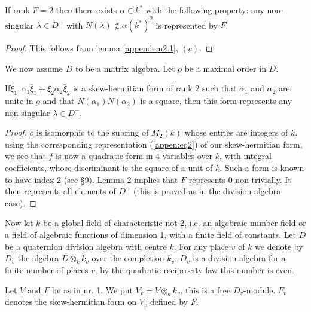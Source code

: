 \begin{lemma}\label{appen:lem2.2}%
If rank $F= 2$ then there exists $\alpha \in k^*$
  with the following property: any non-singular $\lambda \in D^-$ with
  $N(\lambda) \notin \alpha (k^*)^2$ is represented by $F$. 
\end{lemma}

\begin{proof}
This follows from lemma \ref{appen:lem2.1}, $(c)$.
\end{proof}

We now assume $D$ to be a matrix algebra. Let $\underbar{o}$ be a
maximal order in $D$. 

\begin{lemma}\label{appen:lem2.3}
 If\pageoriginale $\xi_1,\alpha_1 \bar{\xi}_1+ \xi_2 \alpha_2
 \bar{\xi}_2$ is a skew-hermitian form of rank 2 such that $\alpha_1$
 and $\alpha_2$ are unite in $\underbar{o}$ and that
 $N(\alpha_1)N(\alpha_2)$ is a square, then this form represents any
 non-singular $\lambda \in D^-$. 
\end{lemma}

\begin{proof}
$\underbar{o}$ is isomorphic to the subring of $M_2(k)$ whose entries
  are integers of $k$. using the corresponding representation (\ref{appen:eq2}) of
  our skew-hermitian form, we see that $f$ is now a quadratic form in
  $4$ variables over $k$, with integral coefficients, whose
  discriminant is the square of a unit of $k$. Such a form is known to
  have index 2 (see \cite{keyE3} \S 9). Lemma 2 implies that $F$
  represents $0$ non-trivially. It then represents all elements of
  $D^-$ (this is proved as in the division algebra case). 
\end{proof}


\medskip
{}%

Now let $k$ be a global field of characteristic not 2, i.e. an
algebraic number field or a field of algebraic functions of dimension
1, with a finite field of constants. Let $D$ be a quaternion
division algebra with centre $k$. For any place $v$ of $k$ we denote
by $D_v$ the algebra $D \otimes_k k_v$ over the completion
$k_v$. $D_v$ is a division algebra for a finite number of places $v$,
by the quadratic reciprocity law this number is even. 

Let $V$ and $F$ be as in nr. 1. We put $V_v=V \otimes_k k_v$, this
is a free $D_v$-module. $F_v$ denotes the skew-hermitian form on $V_v$
defined by $F$. 

